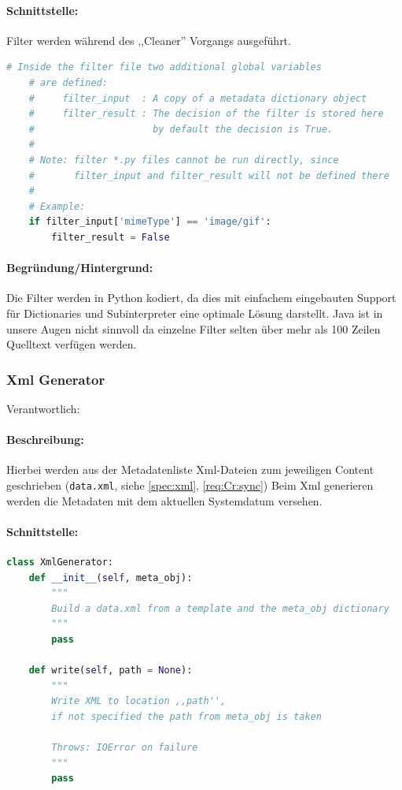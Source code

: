 \paragraph{Schnittstelle:}
\label{par:schnittstelle_}
Filter werden während des ,,Cleaner'' Vorgangs ausgeführt.
\begin{lstlisting}[language=python]
    # Inside the filter file two additional global variables
    # are defined:
    #     filter_input  : A copy of a metadata dictionary object
    #     filter_result : The decision of the filter is stored here
    #                     by default the decision is True.
    #
    # Note: filter *.py files cannot be run directly, since 
    #       filter_input and filter_result will not be defined there
    #
    # Example:
    if filter_input['mimeType'] == 'image/gif':
        filter_result = False
\end{lstlisting}

\paragraph{Begründung/Hintergrund:}
\label{par:begr_ndung_}
Die Filter werden in Python kodiert, da dies mit einfachem eingebauten Support für
Dictionaries und Subinterpreter eine optimale Lösung darstellt.
Java ist in unsere Augen nicht sinnvoll da einzelne Filter
selten über mehr als 100 Zeilen Quelltext verfügen werden.


\subsubsection{Xml Generator}
Verantwortlich: \ci 
\label{ssub:xmlgen}
\paragraph{Beschreibung:}
\label{par:beschreibung_}
Hierbei werden aus der Metadatenliste Xml-Dateien zum jeweiligen Content
geschrieben (\texttt{data.xml}, siehe \ref{spec:xml}, \ref{req:Cr:sync}) 
Beim Xml generieren werden die Metadaten mit dem aktuellen Systemdatum versehen.
\paragraph{Schnittstelle:}
\label{par:schnittstelle_}
\hfill

\begin{lstlisting}[language=python]
class XmlGenerator:
    def __init__(self, meta_obj):
        """
        Build a data.xml from a template and the meta_obj dictionary
        """
        pass

    def write(self, path = None):
        """
        Write XML to location ,,path'', 
        if not specified the path from meta_obj is taken

        Throws: IOError on failure
        """
        pass
\end{lstlisting}

